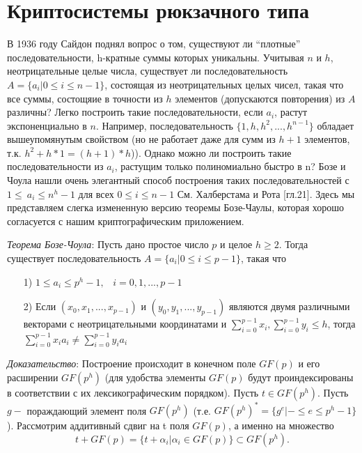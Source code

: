 \documentclass[a4paper,12pt]{article}
\begin{document}
\section{Криптосистемы рюкзачного типа }
В 1936 году Сайдон поднял вопрос о том, существуют ли “плотные” последовательности, h-кратные суммы которых уникальны. Учитывая $n$ и $h$, неотрицательные целые числа, существует ли последовательность $ A = \{a_i |  0 \leq i \leq n-1\}$, состоящая из неотрицательных целых чисел, такая что все суммы, состощяие в точности из $h$ элементов (допускаются повторения) из $A$ различны? Легко построить такие последовательности, если $a_i$, растут экспоненциально в $n$. Например, последовательность $\{1, h, h^2, ..., h^{n-1}\}$ обладает вышеупомянутым свойством (но не работает даже для сумм из $h+1$ элементов, т.к. $h^2 + h*1 = (h+1)*h$)). Однако можно ли построить такие последовательности из $a_i$, растущим только полиномиально быстро в n? Бозе и Чоула \cite{3} нашли очень элегантный способ построения таких последовательностей с $1 \leq\ a_i \leq n^h -1$ для всех $0 \leq i \leq n-1$ См. Халберстама и Рота \cite{14} [гл.21]. Здесь мы представляем слегка измененную версию теоремы Бозе-Чаулы, которая хорошо согласуется с нашим криптографическим приложением.

\textsl{Теорема Бозе-Чоула}: Пусть дано простое число $p$ и целое $h \geq 2$. Тогда существует последовательность $A = \{a_i | 0\leq i \leq p -1\}$, такая что \newline
\begin{itemize}
  \item[1)] $1 \leq a_i \leq p^h -1, \;\;\; i = 0,1,...,p-1$
  \item[2)] Если $(x_0, x_1, ... , x_{p-1})$ и $(y_0, y_1,...,y_{p-1})$ являются двумя
различными векторами с неотрицательными координатами и $\sum_{i=0}^{p-1}x_i, \sum_{i=0}^{p-1}y_i \leq h$, тогда $\sum_{i=0}^{p-1}x_i a_i \neq \sum_{i=0}^{p-1}y_i a_i$
\end{itemize}

\noindent \textsl{Доказательство}: \newline
Построение происходит в конечном поле $GF(p)$ и его расширении $GF(p^h)$ (для удобства элементы $GF(p)$ будут проиндексированы в соответствии с их лексикографическим порядком). Пусть $t \in GF(p^h)$. Пусть $g -$ пораждающий элемент поля $GF(p^h)$ (т.е. $GF(p^h)^* = \{ g^e | - \leq e \leq p^h - 1 \}$). Рассмотрим аддитивный сдвиг на t поля $GF(p)$, а именно на множество 
$$ t + GF(p) = \{t + \alpha_i|\alpha_i \in GF(p) \} \subset GF(p^h). $$ 
\end{document}
